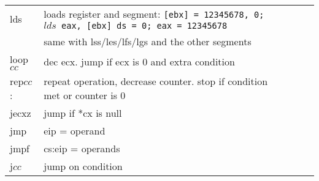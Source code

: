 \begin{tabular}{lllll}
\midrule
lds 	&loads register and segment: {\tt [ebx] = 12345678, 0; $lds$ eax, [ebx] \ra ds = 0; eax = 12345678}\\%
& same with lss/les/lfs/lgs and the other segments\\
loop$cc$ 	& dec ecx. jump if ecx is 0 and extra condition\\
rep$cc$: 	& repeat operation, decrease counter. stop if condition met or counter is 0\\
jecxz 	& jump if *cx is null\\
jmp 	& eip = operand \\
jmpf 	& cs:eip = operands \\
j$cc$ 	& jump on condition \\
\bottomrule
\end{tabular}


